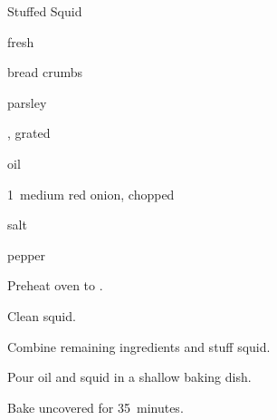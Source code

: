 \begin{recipe}{Stuffed Squid\UNTESTED}{}{}

\begin{ingredients}
\item {} fresh 
\item \C{2\half} bread crumbs
\item {} parsley
\item {} , grated
\item {} oil
\item 1~medium red onion, chopped
\item salt
\item pepper
\end{ingredients}

\begin{directions}
\item Preheat oven to .
\item Clean squid.
\item Combine remaining ingredients and stuff squid.
\item Pour \C{\half} oil and squid in a shallow baking dish.
\item Bake uncovered for 35~minutes.
\end{directions}

\end{recipe}
